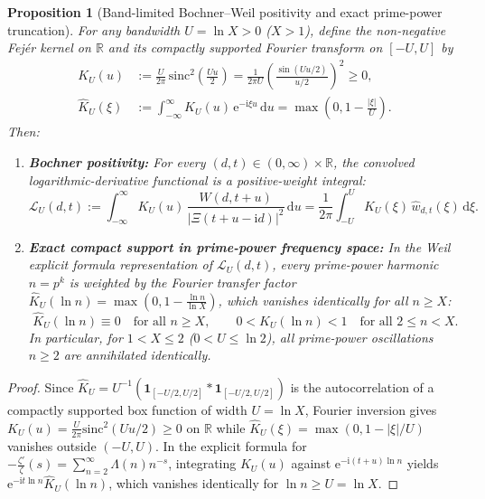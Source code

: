 \documentclass[11pt,reqno,a4paper]{amsart}
\theoremstyle{plain}
\newtheorem{proposition}[theorem]{Proposition}
\theoremstyle{definition}
\theoremstyle{remark}
\numberwithin{equation}{section}
\newcommand{\dd}{\mathrm{d}}
\newcommand{\ii}{\mathrm{i}}
\newcommand{\ee}{\mathrm{e}}
\begin{document}
\begin{proposition}[Band-limited Bochner--Weil positivity and exact prime-power truncation]\label{prop:bochner_weil}
For any bandwidth $U = \ln X > 0$ ($X > 1$), define the non-negative Fej\'er kernel on $\mathbb{R}$ and its compactly supported Fourier transform on $[-U, U]$ by
\begin{equation}\label{eq:fejer_pair_def}
\begin{aligned}
  K_U(u) &:= \frac{U}{2\pi}\,\mathrm{sinc}^2\left(\frac{Uu}{2}\right) = \frac{1}{2\pi U}\left(\frac{\sin(Uu/2)}{u/2}\right)^2 \ge 0, \\
  \widehat{K}_U(\xi) &:= \int_{-\infty}^{\infty} K_U(u)\,\ee^{-\ii\xi u}\,\dd u = \max\left(0, 1 - \frac{|\xi|}{U}\right).
\end{aligned}
\end{equation}
Then:
\begin{enumerate}[label=\textup{(\arabic*)},leftmargin=2.2em]
  \item \textbf{Bochner positivity:} For every $(d,t) \in (0,\infty)\times\mathbb{R}$, the convolved logarithmic-derivative functional is a positive-weight integral:
  \begin{equation}\label{eq:L_U_bochner}
    \mathcal{L}_U(d,t) := \int_{-\infty}^{\infty} K_U(u)\,\frac{W(d, t+u)}{|\Xi(t+u-\ii d)|^2}\,\dd u
    = \frac{1}{2\pi}\int_{-U}^{U}\widehat{K}_U(\xi)\,\widehat{w}_{d,t}(\xi)\,\dd\xi.
  \end{equation}
  \item \textbf{Exact compact support in prime-power frequency space:} In the Weil explicit formula representation of $\mathcal{L}_U(d,t)$, every prime-power harmonic $n = p^k$ is weighted by the Fourier transfer factor $\widehat{K}_U(\ln n) = \max(0, 1 - \frac{\ln n}{\ln X})$, which vanishes identically for all $n \ge X$:
  \begin{equation}\label{eq:K_U_truncation}
    \widehat{K}_U(\ln n) \equiv 0 \quad \text{for all } n \ge X, \qquad
    0 < \widehat{K}_U(\ln n) < 1 \quad \text{for all } 2 \le n < X.
  \end{equation}
  In particular, for $1 < X \le 2$ ($0 < U \le \ln 2$), all prime-power oscillations $n \ge 2$ are annihilated identically.
\end{enumerate}
\end{proposition}

\begin{proof}
Since $\widehat{K}_U = U^{-1}(\mathbf{1}_{[-U/2,U/2]} * \mathbf{1}_{[-U/2,U/2]})$ is the autocorrelation of a compactly supported box function of width $U = \ln X$, Fourier inversion gives $K_U(u) = \frac{U}{2\pi}\mathrm{sinc}^2(Uu/2) \ge 0$ on $\mathbb{R}$ while $\widehat{K}_U(\xi) = \max(0, 1 - |\xi|/U)$ vanishes outside $(-U, U)$. In the explicit formula for $-\frac{\zeta'}{\zeta}(s) = \sum_{n=2}^\infty \Lambda(n)n^{-s}$, integrating $K_U(u)$ against $\ee^{-\ii(t+u)\ln n}$ yields $\ee^{-\ii t\ln n}\widehat{K}_U(\ln n)$, which vanishes identically for $\ln n \ge U = \ln X$.
\end{proof}
\end{document}
